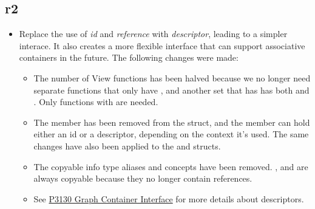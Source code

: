 \subsection*{\paperno r2}
\begin{itemize}
      \item Replace the use of \textit{id} and \textit{reference} with \textit{descriptor}, leading to a simpler
            interace. It also creates a more flexible interface that can support associative containers in the future. 
            The following changes were made:
            \begin{itemize}
                  \item The number of View functions has been halved because we no longer need separate functions that 
                        only have , and another set that has has both  and . Only functions
                        with  are needed.
                  \item The  member has been removed from the  struct, and the 
                        member can hold either an id or a descriptor, depending on the context it's used. The same changes have 
                        also been applied to the  and  structs.
                  \item The copyable info type aliases and concepts have been removed. ,  
                        and  are always copyable because they no longer contain references.
                  \item See \href{https://www.wg21.link/P3130}{P3130 Graph Container Interface} for more details about
                        descriptors.
            \end{itemize}
\end{itemize}
